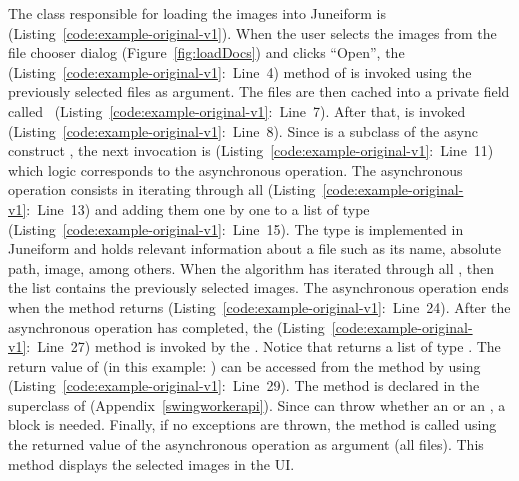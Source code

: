 \documentclass[type=bsc,accentcolor=tud9c]{tudthesis}
\begin{document}
The class responsible for loading the images into Juneiform is  (Listing~\ref{code:example-original-v1}). When the user selects the images from the file chooser dialog (Figure~\ref{fig:loadDocs}) and clicks ``Open'', the  (Listing~\ref{code:example-original-v1}:~Line~4) method of  is invoked using the previously selected files as argument. The files are then cached into a private field called ~(Listing~\ref{code:example-original-v1}:~Line~7). After that,  is invoked (Listing~\ref{code:example-original-v1}:~Line~8). Since  is a subclass of the async construct , the next invocation is  (Listing~\ref{code:example-original-v1}:~Line~11) which logic corresponds to the asynchronous operation. The asynchronous operation consists in iterating through all  (Listing~\ref{code:example-original-v1}:~Line~13) and adding them one by one to a list  of type  (Listing~\ref{code:example-original-v1}:~Line~15). The type  is implemented in Juneiform and holds relevant information about a file such as its name, absolute path, image, among others. When the algorithm has iterated through all , then the list  contains the previously selected images. The asynchronous operation ends when the method  returns (Listing~\ref{code:example-original-v1}:~Line~24). After the asynchronous operation has completed, the  (Listing~\ref{code:example-original-v1}:~Line~27) method is invoked by the . Notice that  returns a list of type . The return value of  (in this example: ) can be accessed from the method  by using  (Listing~\ref{code:example-original-v1}:~Line~29). The method  is declared in the superclass of  (Appendix~\ref{swingworkerapi}). Since  can throw whether an  or an , a  block is needed. Finally, if no exceptions are thrown, the  method is called using the returned value of the asynchronous operation as argument (all files). This method displays the selected images in the UI.
\end{document}
